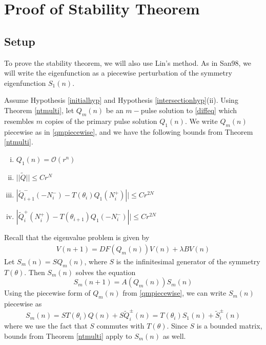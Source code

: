 \documentclass[12pt]{article}
\begin{document}
\section{Proof of Stability Theorem}

\subsection{Setup}

To prove the stability theorem, we will also use Lin's method. As in San98, we will write the eigenfunction as a piecewise perturbation of the symmetry eigenfunction $S_1(n)$. 

Assume Hypothesis \ref{initialhyp} and Hypothesis \ref{intersectionhyp}(ii). Using Theorem \ref{ntmulti}, let $Q_m(n)$ be an $m-$pulse solution to \eqref{diffeq} which resembles $m$ copies of the primary pulse solution $Q_1(n)$. We write $Q_m(n)$ piecewise as in \eqref{qmpiecewise}, and we have the following bounds from Theorem \ref{ntmulti}.
\begin{enumerate}[(i)]
\item $Q_1(n) = \mathcal{O}(r^n)$
\item $||\tilde{Q}|| \leq C r^N$
\item $|\tilde{Q}_{i+1}^-(-N_i^-) - T(\theta_i) Q_1(N_i^+)|| \leq C r^{2N}$ 
\item $|\tilde{Q}_i^+(N_i^+) - T(\theta_{i+1}) Q_1(-N_i^-)|| \leq C r^{2N}$
\end{enumerate}

Recall that the eigenvalue problem is given by 
\begin{align*}
V(n+1) = DF(Q_m(n)) V(n) + \lambda B V(n)
\end{align*}
Let $S_m(n) = S Q_m(n)$, where $S$ is the infinitesimal generator of the symmetry $T(\theta)$. Then $S_m(n)$ solves the equation
\begin{equation}\label{Smsolves}
S_m(n+1) = A(Q_m(n))S_m(n)
\end{equation}
Using the piecewise form of $Q_m(n)$ from \eqref{qmpiecewise}, we can write $S_m(n)$ piecewise as 
\begin{equation}\label{Smdef}
S_m(n) = S T(\theta_i) Q(n) + S \tilde{Q}_i^\pm(n)
= T(\theta_i) S_1(n) + \tilde{S}_i^\pm(n)
\end{equation}
where we use the fact that $S$ commutes with $T(\theta)$. Since $S$ is a bounded matrix, bounds from Theorem \ref{ntmulti} apply to $S_m(n)$ as well.
\end{document}
